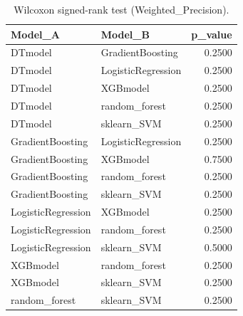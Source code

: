 \begin{table}[t]
\centering
\begin{tabular}{llr}
\toprule
Model_A & Model_B & p_value \\
\midrule
DTmodel & GradientBoosting & 0.2500 \\
DTmodel & LogisticRegression & 0.2500 \\
DTmodel & XGBmodel & 0.2500 \\
DTmodel & random_forest & 0.2500 \\
DTmodel & sklearn_SVM & 0.2500 \\
GradientBoosting & LogisticRegression & 0.2500 \\
GradientBoosting & XGBmodel & 0.7500 \\
GradientBoosting & random_forest & 0.2500 \\
GradientBoosting & sklearn_SVM & 0.2500 \\
LogisticRegression & XGBmodel & 0.2500 \\
LogisticRegression & random_forest & 0.2500 \\
LogisticRegression & sklearn_SVM & 0.5000 \\
XGBmodel & random_forest & 0.2500 \\
XGBmodel & sklearn_SVM & 0.2500 \\
random_forest & sklearn_SVM & 0.2500 \\
\bottomrule
\end{tabular}
\caption{Wilcoxon signed-rank test (Weighted_Precision).}
\label{tab:wilcoxon_Weighted_Precision}
\end{table}